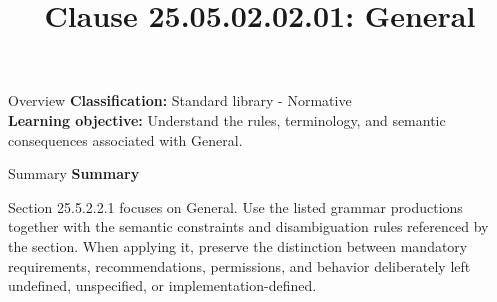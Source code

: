 \documentclass[10pt,letterpaper]{article}
\title{Clause 25.05.02.02.01: General}
\author{}
\date{}
\begin{document}
\maketitle
\begin{CornellOverviewBox}{Overview}
\textbf{Classification:} Standard library - Normative\\[2pt]
\textbf{Learning objective:} Understand the rules, terminology, and semantic consequences associated with General.
\end{CornellOverviewBox}\begin{CornellSummaryBox}{Summary}
{\sffamily\bfseries\color{Accent} Summary}\par\vspace{3pt}Section 25.5.2.2.1 focuses on General. Use the listed grammar productions together with the semantic constraints and disambiguation rules referenced by the section. When applying it, preserve the distinction between mandatory requirements, recommendations, permissions, and behavior deliberately left undefined, unspecified, or implementation-defined.
\end{CornellSummaryBox}
\end{document}

